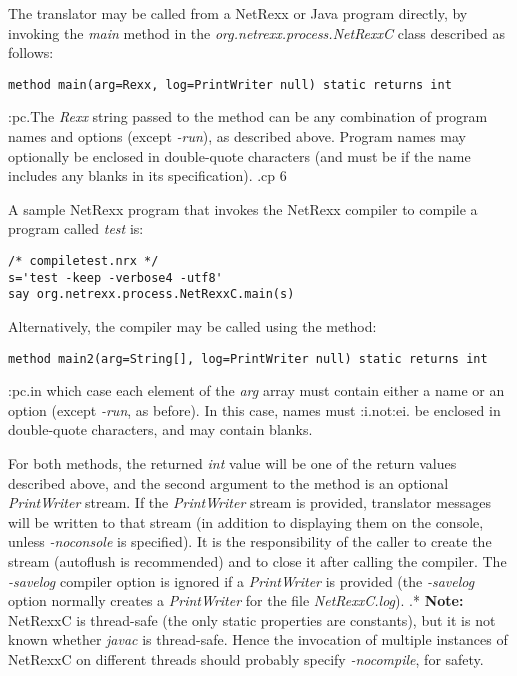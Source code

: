 The translator may be called from a NetRexx or Java program directly, by
invoking the \emph{main} method in the \emph{org.netrexx.process.NetRexxC}
class described as follows:
\begin{verbatim}
method main(arg=Rexx, log=PrintWriter null) static returns int
\end{verbatim}
:pc.The \emph{Rexx} string passed to the method can be any combination of
program names and options (except \emph{-run}), as described above.
Program names may optionally be enclosed in double-quote characters (and
must be if the name includes any blanks in its specification).
.cp 6

A sample NetRexx program that invokes the NetRexx compiler to compile a
program called \emph{test} is:
\begin{verbatim}
/* compiletest.nrx */
s='test -keep -verbose4 -utf8'
say org.netrexx.process.NetRexxC.main(s)
\end{verbatim}

Alternatively, the compiler may be called using the method:
\begin{verbatim}
method main2(arg=String[], log=PrintWriter null) static returns int
\end{verbatim}
:pc.in which case each element of the \emph{arg} array must contain
either a name or an option (except \emph{-run}, as before).  In this
case, names must :i.not:ei. be enclosed in double-quote characters, and
may contain blanks.

For both methods, the returned \emph{int} value will be one of the
return values described above, and the second argument to the method is
an optional \emph{PrintWriter} stream.  If the \emph{PrintWriter} stream
is provided, translator messages will be written to that stream (in
addition to displaying them on the console, unless \emph{-noconsole} is
specified).
It is the responsibility of the caller to create the stream (autoflush
is recommended) and to close it after calling the compiler.
The \emph{-savelog} compiler option is ignored if a \emph{PrintWriter}
is provided (the \emph{-savelog} option normally creates
a \emph{PrintWriter} for the file \emph{NetRexxC.log}).
.*
\textbf{Note:} NetRexxC is thread-safe (the only static properties are constants), but
it is not known whether \emph{javac} is thread-safe.  Hence the
invocation of multiple instances of NetRexxC on different threads should
probably specify \emph{-nocompile}, for safety.

